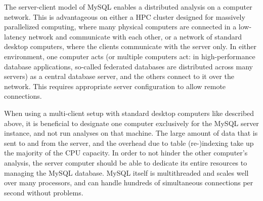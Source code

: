 The server-client model of MySQL enables a distributed analysis on a computer
network. This is advantageous on either a HPC cluster designed for massively
parallelized computing, where many physical computers are connected in a
low-latency network and communicate with each other, or a network of standard
desktop computers, where the clients communicate with the server only. In either
environment, one computer acts (or multiple computers act: in high-performance
database applications, so-called federated databases are distributed across many
servers) as a central database server, and the others connect to it over the
network. This requires appropriate server configuration to allow remote
connections.



When using a multi-client setup with standard desktop computers like described
above, it is beneficial to designate one computer exclusively for the MySQL
server instance, and not run \pname analyses on that machine. The large amount
of data that is sent to and from the server, and the overhead due to table
(re-)indexing take up the majority of the CPU capacity. In order to not hinder
the other computer's analysis, the server computer should be able to dedicate
its entire resources to managing the MySQL database. MySQL itself is
multithreaded and scales well over many processors, and can handle hundreds of
simultaneous connections per second without problems. 
